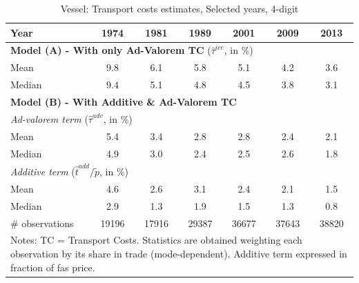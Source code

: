 \documentclass[a4paper,11pt]{article}
\begin{document}
\begin{table}[htbp]
  \centering
\caption{Vessel: Transport costs estimates, Selected years, 4-digit}
\begin{center}
    \begin{tabular}{l|cccccc}
   \hline\hline
Year & 1974  & 1981  & 1989  & 2001  & 2009  & 2013 \\
\hline
\multicolumn{7}{l}{\textbf{Model (A) - With only Ad-Valorem TC} ($\widehat{\tau}^{ice}$, in \%)} \\
\hline
Mean  & 9.8 & 6.1 & 5.8 & 5.1 & 4.2 & 3.6  \\
Median & 9.4 & 5.1 & 4.8 & 4.5 & 3.8 & 3.1 \\
\hline
\multicolumn{7}{l}{\textbf{Model (B) - With Additive \& Ad-Valorem TC} }\\ \hline
\multicolumn{7}{l}{\textit{Ad-valorem term} ($\widehat{\tau}^{adv}$, in \%) }   \\ \hline
Mean  & 5.4 & 3.4 & 2.8 & 2.8 & 2.4 & 2.1  \\
Median & 4.9 & 3.0 & 2.4 & 2.5 & 2.6 & 1.8 \\
\hline
\multicolumn{7}{l}{\textit{Additive term} ($\widehat{t}^{add}/\widetilde{p}$, in \%) }   \\ \hline
Mean  & 4.6 & 2.6 & 3.1 & 2.4 & 2.1 & 1.5  \\
Median & 2.9 & 1.3 & 1.9 & 1.5 & 1.3 & 0.8 \\
\hline
\# observations & 19196 & 17916 & \multicolumn{1}{c}{29387} & \multicolumn{1}{c}{36677} & \multicolumn{1}{c}{37643} & \multicolumn{1}{c}{38820} \\
\hline\hline
\multicolumn{7}{l}{\parbox[l]{11cm}{ \vspace{7pt}\scriptsize{Notes: TC = Transport Costs. Statistics are obtained weighting each observation by its share in trade (mode-dependent). Additive term expressed in fraction of fas price.}}}
\end{tabular}%
\end{center}
\label{tab:result_ves_rob}%
\end{table}%
\end{document}
